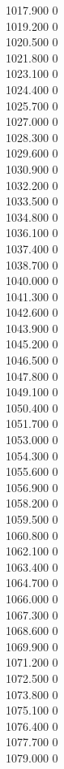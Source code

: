 { 1017.900	0 \\
 1019.200	0 \\
 1020.500	0 \\
 1021.800	0 \\
 1023.100	0 \\
 1024.400	0 \\
 1025.700	0 \\
 1027.000	0 \\
 1028.300	0 \\
 1029.600	0 \\
 1030.900	0 \\
 1032.200	0 \\
 1033.500	0 \\
 1034.800	0 \\
 1036.100	0 \\
 1037.400	0 \\
 1038.700	0 \\
 1040.000	0 \\
 1041.300	0 \\
 1042.600	0 \\
 1043.900	0 \\
 1045.200	0 \\
 1046.500	0 \\
 1047.800	0 \\
 1049.100	0 \\
 1050.400	0 \\
 1051.700	0 \\
 1053.000	0 \\
 1054.300	0 \\
 1055.600	0 \\
 1056.900	0 \\
 1058.200	0 \\
 1059.500	0 \\
 1060.800	0 \\
 1062.100	0 \\
 1063.400	0 \\
 1064.700	0 \\
 1066.000	0 \\
 1067.300	0 \\
 1068.600	0 \\
 1069.900	0 \\
 1071.200	0 \\
 1072.500	0 \\
 1073.800	0 \\
 1075.100	0 \\
 1076.400	0 \\
 1077.700	0 \\
 1079.000	0 \\
}
